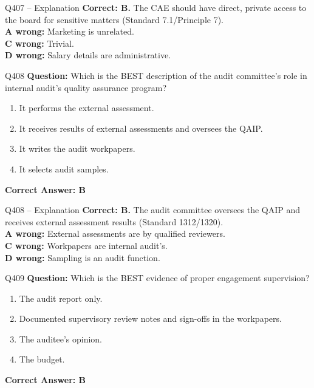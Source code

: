\documentclass[aspectratio=169,10pt]{beamer}
\begin{document}
	\begin{frame}[t]{Q407 -- Explanation}
		\small
		\textbf{Correct: B.} The CAE should have direct, private access to the board for sensitive matters (Standard 7.1/Principle 7). \\[4pt]
		\textbf{A wrong:} Marketing is unrelated. \\[2pt]
		\textbf{C wrong:} Trivial. \\[2pt]
		\textbf{D wrong:} Salary details are administrative.
	\end{frame}
	
	\begin{frame}[t]{Q408}
		\small
		\textbf{Question:} Which is the BEST description of the audit committee's role in internal audit's quality assurance program?
		\begin{enumerate}[label=\Alph*.,itemsep=1pt,topsep=2pt]
			\item It performs the external assessment.
			\item It receives results of external assessments and oversees the QAIP.
			\item It writes the audit workpapers.
			\item It selects audit samples.
		\end{enumerate}
		\vspace{4pt}
		\textbf{Correct Answer: B}
	\end{frame}
	
	\begin{frame}[t]{Q408 -- Explanation}
		\small
		\textbf{Correct: B.} The audit committee oversees the QAIP and receives external assessment results (Standard 1312/1320). \\[4pt]
		\textbf{A wrong:} External assessments are by qualified reviewers. \\[2pt]
		\textbf{C wrong:} Workpapers are internal audit's. \\[2pt]
		\textbf{D wrong:} Sampling is an audit function.
	\end{frame}
	
	\begin{frame}[t]{Q409}
		\small
		\textbf{Question:} Which is the BEST evidence of proper engagement supervision?
		\begin{enumerate}[label=\Alph*.,itemsep=1pt,topsep=2pt]
			\item The audit report only.
			\item Documented supervisory review notes and sign-offs in the workpapers.
			\item The auditee's opinion.
			\item The budget.
		\end{enumerate}
		\vspace{4pt}
		\textbf{Correct Answer: B}
	\end{frame}
	
\end{document}
